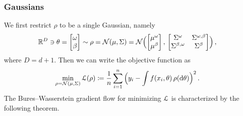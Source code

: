 \documentclass{custom}
\begin{document}
\subsubsection{Gaussians}\label{app:regression_gaussian}


We first restrict $\rho$ to be a single Gaussian, namely
\[
\mathbb R^D \ni
\theta=\begin{bmatrix}
\omega\\
\beta
\end{bmatrix}\sim\rho = \mathcal{N}(\mu,\Sigma) = \mathcal{N}\Bigl(\begin{bmatrix}
\mu^\omega\\
\mu^{\beta}
\end{bmatrix},\,\begin{bmatrix}
\Sigma^{\omega} & \Sigma^{\omega,\beta}\\
\Sigma^{\beta,\omega} & \Sigma^{\beta}
\end{bmatrix}\Bigr)\,,
\]
where $D = d+1$.
Then we can write the objective function as
\begin{equation}
\min_{\rho=\mathcal{N}(\mu,\Sigma)}\EuScript{L}(\rho)\coloneqq\frac{1}{n}\sum_{i=1}^{n} {\Bigl(y_i - \int f(x_{i},\theta)\,\rho(\mathrm d\theta)\Bigr)^{2}}\,.\label{eq:loss-regression-gaussian}
\end{equation}
The Bures--Wasserstein gradient flow for minimizing $\EuScript{L}$ is
characterized by the following theorem.
\end{document}
